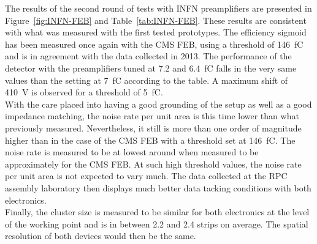 	The results of the second round of tests with INFN preamplifiers are presented in Figure~\ref{fig:INFN-FEB} and Table~\ref{tab:INFN-FEB}. These results are consistent with what was measured with the first tested prototypes. The efficiency sigmoid has been measured once again with the CMS FEB, using a threshold of \SI{146}{fC} and is in agreement with the data collected in 2013. The performance of the detector with the preamplifiers tuned at 7.2 and \SI{6.4}{fC} falls in the very same values than the setting at \SI{7}{fC} according to the table. A maximum shift of \SI{410}{V} is observed for a threshold of \SI{5}{fC}.\\
	With the care placed into having a good grounding of the setup as well as a good impedance matching, the noise rate per unit area is this time lower than what previously measured. Nevertheless, it still is more than one order of magnitude higher than in the case of the CMS FEB with a threshold set at \SI{146}{fC}. The noise rate is measured to be at lowest around  when measured to be approximately  for the CMS FEB. At such high threshold values, the noise rate per unit area is not expected to vary much. The data collected at the RPC assembly laboratory then displays much better data tacking conditions with both electronics.\\
	Finally, the cluster size is measured to be similar for both electronics at the level of the working point and is in between 2.2 and 2.4 strips on average. The spatial resolution of both devices would then be the same.
	
